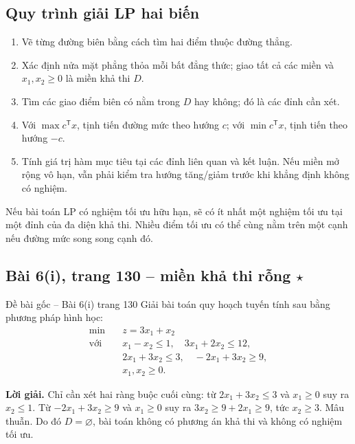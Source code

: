 \documentclass[11pt,a4paper]{article}
\newcommand{\T}{^{\mathsf T}}
\begin{document}
\subsection{Quy trình giải LP hai biến}
\begin{enumerate}
\item Vẽ từng đường biên bằng cách tìm hai điểm thuộc đường thẳng.
\item Xác định nửa mặt phẳng thỏa mỗi bất đẳng thức; giao tất cả các miền và \(x_1,x_2\ge0\) là miền khả thi \(D\).
\item Tìm các giao điểm biên có nằm trong \(D\) hay không; đó là các đỉnh cần xét.
\item Với \(\max c\T x\), tịnh tiến đường mức theo hướng \(c\); với \(\min c\T x\), tịnh tiến theo hướng \(-c\).
\item Tính giá trị hàm mục tiêu tại các đỉnh liên quan và kết luận. Nếu miền mở rộng vô hạn, vẫn phải kiểm tra hướng tăng/giảm trước khi khẳng định không có nghiệm.
\end{enumerate}
Nếu bài toán LP có nghiệm tối ưu hữu hạn, sẽ có ít nhất một nghiệm tối ưu tại một đỉnh của đa diện khả thi. Nhiều điểm tối ưu có thể cùng nằm trên một cạnh nếu đường mức song song cạnh đó.

\subsection{Bài 6(i), trang 130 -- miền khả thi rỗng \(\star\)}
\begin{questionbox}{Đề bài gốc -- Bài 6(i) trang 130}
Giải bài toán quy hoạch tuyến tính sau bằng phương pháp hình học:
\[
\begin{aligned}
\min\quad &z=3x_1+x_2\\
\text{với }&x_1-x_2\le1,\quad 3x_1+2x_2\le12,\\
&2x_1+3x_2\le3,\quad -2x_1+3x_2\ge9,\\
&x_1,x_2\ge0.
\end{aligned}
\]
\end{questionbox}
\textbf{Lời giải.}
Chỉ cần xét hai ràng buộc cuối cùng: từ \(2x_1+3x_2\le3\) và \(x_1\ge0\) suy ra \(x_2\le1\). Từ \(-2x_1+3x_2\ge9\) và \(x_1\ge0\) suy ra \(3x_2\ge9+2x_1\ge9\), tức \(x_2\ge3\). Mâu thuẫn. Do đó \(D=\varnothing\), bài toán không có phương án khả thi và không có nghiệm tối ưu.

\end{document}

